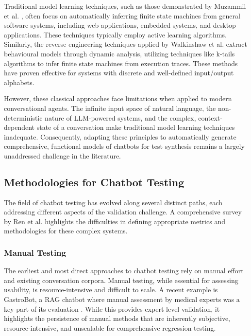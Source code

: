 Traditional model learning techniques,
such as those demonstrated by Muzammil et al. \autocite{shahbazAnalysisTestingBlackbox2014},
often focus on automatically inferring finite state machines
from general software systems,
including web applications, embedded systems, and desktop applications.
These techniques typically employ active learning algorithms.
Similarly, the reverse engineering techniques applied by Walkinshaw et al. \autocite{walkinshawReverseEngineeringSoftwareBehavior2013}
extract behavioural models through dynamic analysis,
utilizing techniques like k-tails algorithms
\autocite{biermannSynthesisFiniteStateMachines1972}
to infer finite state machines from execution traces.
These methods have proven effective for
systems with discrete and well-defined input/output alphabets.

However, these classical approaches
face limitations when applied to modern conversational agents.
The infinite input space of natural language,
the non-deterministic nature of \ac{LLM}-powered systems,
and the complex, context-dependent state of a conversation
make traditional model learning techniques inadequate.
Consequently,
adapting these principles to automatically generate
comprehensive, functional models of chatbots for test synthesis
remains a largely unaddressed challenge in the literature.

\subsection{Methodologies for Chatbot Testing}

The field of chatbot testing has evolved along several distinct paths,
each addressing different aspects of the validation challenge.
A comprehensive survey by Ren et al. \autocite{renEvaluationTechniquesChatbot2019} highlights the difficulties
in defining appropriate metrics and methodologies for these complex systems.

\subsubsection{Manual Testing}

The earliest and most direct approaches to chatbot testing
rely on manual effort and existing conversation corpora.
Manual testing, while essential for assessing usability,
is resource-intensive and difficult to scale.
A recent example is GastroBot,
a \ac{RAG} chatbot where manual assessment by medical experts
was a key part of its evaluation \autocite{zhouGastroBotChineseGastrointestinal2024}.
While this provides expert-level validation,
it highlights the persistence of manual methods
that are inherently subjective, resource-intensive,
and unscalable for comprehensive regression testing.

